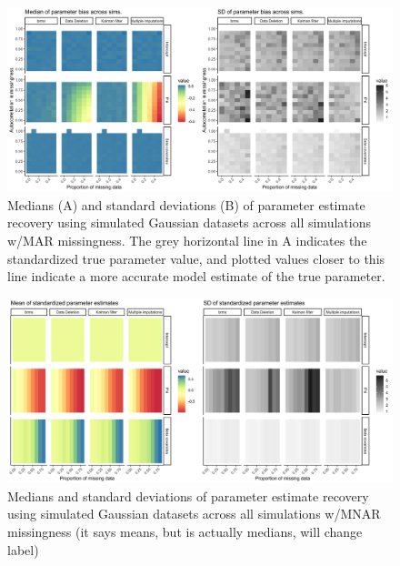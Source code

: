 \documentclass{article}
\begin{document}
\begin{figure}
    \noindent\includegraphics[width = \textwidth]{Figures/heatmap_GaussianMAR_all.png}
    \caption{Medians (A) and standard deviations (B) of parameter estimate recovery using simulated Gaussian datasets across all simulations w/MAR missingness. The grey horizontal line in A indicates the standardized true parameter value, and plotted values closer to this line indicate a more accurate model estimate of the true parameter.
    }
    \label{fig:heatMap_gauss_MAR}
\end{figure}

\begin{figure}
    \noindent\includegraphics[width = \textwidth]{Figures/heatmap_GaussianMNAR_all.png}
    \caption{Medians and standard deviations of parameter estimate recovery using simulated Gaussian datasets across all simulations w/MNAR missingness (it says means,  but is actually medians, will change label)}
    \label{fig:heatMap_gauss_MNAR}
\end{figure}
\end{document}
